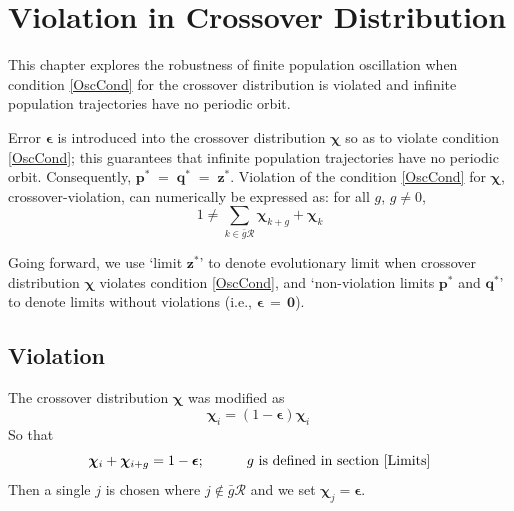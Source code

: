 \chapter{Violation in Crossover Distribution} \label{ch:chiviolation}
This chapter explores the robustness of finite population oscillation when condition \ref{OscCond} 
for the crossover distribution is violated and infinite population trajectories
have no periodic orbit.

Error $\bm{\epsilon}$ is introduced into the crossover distribution $\bm{\chi}$ so as to 
violate condition \ref{OscCond}; this guarantees that 
infinite population trajectories have no periodic orbit. Consequently, $\bm{p}^\ast \;=\; \bm{q}^\ast \;=\; \bm{z}^\ast$. 
Violation of the condition \ref{OscCond} for $\bm{\chi}$, crossover-violation,  
can numerically be expressed as:\newline  
for all $g$,  $g \neq 0$,
\begin{equation}
\label{chi-violation}
  1 \neq \sum \limits_{k \in \bar{g}\mathcal{R}} \bm{\chi}_{k+g} + \bm{\chi}_k  
\end{equation}

Going forward, we use `limit $\bm{z}^\ast$' to denote evolutionary limit when crossover distribution 
$\bm{\chi}$ violates condition \ref{OscCond}, and 
`non-violation limits $\bm{p}^\ast$ and $\bm{q}^\ast$' to denote limits without violations (i.e., $\bm{\epsilon \,=\, 0}$).

\section{Violation}
The crossover distribution $\bm{\chi}$ was modified as
\[
\bm{\chi}_i = (1-\bm{\epsilon}) \bm{\chi}_i\ 
\]
So that 
\[
\bm{\chi}_i + \bm{\chi}_{i+g} = 1-\bm{\epsilon} ; \hspace{30pt} g \text{ is defined in  section } \ref{Limits}
\]
Then a single $j$ is chosen where $j \not\in \bar{g}\mathcal{R}$ and we set $\bm{\chi}_j = \bm{\epsilon}$. 

